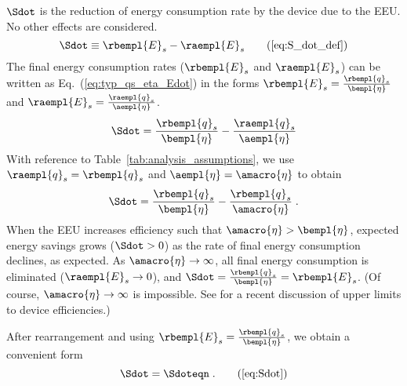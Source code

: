 $\Sdot$ is the reduction of energy consumption rate
by the device due to the EEU.
No other effects are considered.
%
\begin{equation}
  \Sdot \equiv \rbempl{E}_s - \raempl{E}_s  \tag{\ref{eq:S_dot_def}}
\end{equation}
%
The final energy consumption rates ($\rbempl{E}_s$ and $\raempl{E}_s$) 
can be written as Eq.~(\ref{eq:typ_qs_eta_Edot}) in the forms
$\rbempl{E}_s = \frac{\rbempl{q}_s}{\bempl{\eta}}$ and 
$\raempl{E}_s = \frac{\raempl{q}_s}{\aempl{\eta}}$. 
%
\begin{equation}
  \Sdot = \frac{\rbempl{q}_s}{\bempl{\eta}} - \frac{\raempl{q}_s}{\aempl{\eta}}
\end{equation}
%
With reference to Table~\ref{tab:analysis_assumptions}, 
we use $\raempl{q}_s = \rbempl{q}_s$ and $\aempl{\eta} = \amacro{\eta}$ to obtain
%
\begin{equation}
  \Sdot = \frac{\rbempl{q}_s}{\bempl{\eta}} - \frac{\rbempl{q}_s}{\amacro{\eta}} \; .
\end{equation}
%
When the EEU increases efficiency such that $\amacro{\eta} > \bempl{\eta}$,
expected energy savings grows ($\Sdot > 0$)
as the rate of final energy consumption declines,
as expected.
As $\amacro{\eta} \rightarrow \infty$,
all final energy consumption is eliminated ($\raempl{E}_s \rightarrow 0$), and
$\Sdot = \frac{\rbempl{q}_s}{\bempl{\eta}} = \rbempl{E}_s$.
(Of course, $\amacro{\eta} \rightarrow \infty$ is impossible. 
See \citet{Paoli:2020aa} for a recent discussion of upper limits to device efficiencies.)

After rearrangement and using $\rbempl{E}_s = \frac{\rbempl{q}_s}{\bempl{\eta}}$, 
we obtain a convenient form
%
\begin{equation}
  \Sdot = \Sdoteqn \; .  \tag{\ref{eq:Sdot}}
\end{equation}


% 
% 


